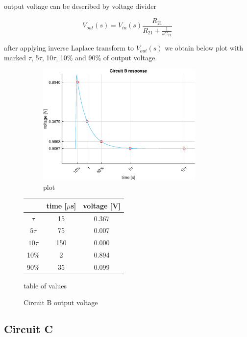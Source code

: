 \documentclass[notitlepage, a4paper, 11pt]{article}
\begin{document}
	output voltage can be described by voltage divider
	
	\begin{equation}
		V_{out}(s) = V_{in}(s) \dfrac{R_{21}}{R_{21} + \frac{1}{sC_{21}}}
	\end{equation}
	
		after applying inverse Laplace transform to $V_{out}(s)$ we obtain below plot with marked $\tau$, 5$\tau$, 10$\tau$, 10\% and 90\% of output voltage.
	
	\begin{figure}[H]
	\centering
	\begin{subfigure}{0.6\textwidth}
		\includegraphics[width=0.9\textwidth]{../Matlab/img/CircuitB.eps}
		\caption{plot}
	\end{subfigure}
	\hfill
	\begin{subtable}{0.38\textwidth}
		\centering
		\begin{tabular}{|c|c|c|}
			\hline
			 & time [$\mu$s] & voltage [V] \\
			\hline
			$\tau$ & 15 & 0.367 \\
			\hline		
			$5\tau$ & 75 & 0.007 \\
			\hline
			$10\tau$ & 150 & 0.000 \\
			\hline
			10\% & 2 & 0.894 \\
			\hline
			90\% & 35 & 0.099 \\
			\hline
		\end{tabular}
		\caption{table of values}
	\end{subtable}
	\caption{Circuit B output voltage}
\end{figure}
	
	\subsection{Circuit C}
	
\end{document}
